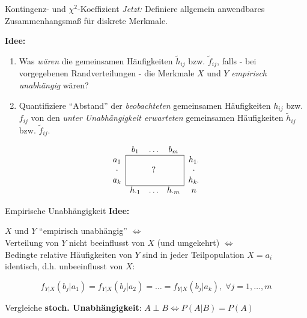\documentclass[
  10pt,
  ignorenonframetext,
]{beamer}
\begin{document}
\begin{frame}{Kontingenz- und \(\chi^2\)-Koeffizient}
\label{kontingenz--und-chi2-koeffizient}
\emph{Jetzt:} Definiere allgemein anwendbares Zusammenhangsmaß für
diskrete Merkmale.

\textbf{Idee:}

\begin{enumerate}
\item
  Was \emph{wären} die gemeinsamen Häufigkeiten \(\tilde{h}_{ij}\) bzw.
  \(\tilde{f}_{ij}\), falls - bei vorgegebenen Randverteilungen - die
  Merkmale \(X\) und \(Y\) \emph{empirisch unabhängig} wären?
\item
  Quantifiziere ``Abstand'' der \emph{beobachteten} gemeinsamen
  Häufigkeiten \(h_{ij}\) bzw. \(f_{ij}\) von den \emph{unter
  Unabhängigkeit erwarteten} gemeinsamen Häufigkeiten \(\tilde{h}_{ij}\)
  bzw. \(\tilde{f}_{ij}\).
\end{enumerate}

\vspace*{0.5cm}

\begin{displaymath}
\begin{array}{c|ccc|c}
\multicolumn{1}{c}{}
& \multicolumn{1}{c}{b_1}
  & \dots
    & \multicolumn{1}{c}{b_m}\\\cline{2-4}
a_1    &  &   &  & h_{1\cdot}\\
\cdot &  & ? &  & \cdot \\
a_k    &  &   &  & h_{k\cdot}\\\cline{2-4}
\multicolumn{1}{c}{}
  & \multicolumn{1}{c}{h_{\cdot 1} }
    & \dots
      & \multicolumn{1}{c}{h_{\cdot m} }
        & \multicolumn{1}{c}{n}
\end{array}
\end{displaymath}
\end{frame}

\begin{frame}{Empirische Unabhängigkeit}
\label{empirische-unabhuxe4ngigkeit}
\textbf{Idee:}

\(X\) und \(Y\) ``empirisch unabhängig'' \(\iff\)\\
Verteilung von \(Y\) nicht beeinflusst von \(X\) (und umgekehrt)
\(\iff\)\\
Bedingte relative Häufigkeiten von \(Y\) sind in jeder Teilpopulation
\(X = a_i\) identisch, d.h. unbeeinflusst von \(X\):

\[f_{Y|X}(b_j|a_1) = f_{Y|X}(b_j|a_2) = \ldots = f_{Y|X}(b_j|a_k), \;\forall j = 1,\ldots,m\]

Vergleiche \textbf{stoch. Unabhängigkeit}:
\(A \perp B \iff P(A|B)= P(A)\)
\end{frame}
\end{document}
